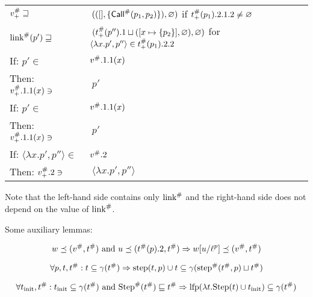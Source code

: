 \begin{center}
\begin{tabular}{|l@{\hskip2pt}l|}
    \hfill ${v}^{\#}_+\sqsupseteq$                            & $\:(([],\{{\mathsf{Call}}^{\#}(p_1,p_2)\}),\varnothing)$                                      \hfill if ${t}^{\#}_+(p_1).2.1.2\neq\varnothing$                  \\
    \hfill ${\textnormal{link}}^{\#}(p')\sqsupseteq$                        & $\:({t}^{\#}_+(p'').1\sqcup([x\mapsto\{p_2\}],\varnothing),\varnothing)$          \hfill for $\langle\lambda x.p',p''\rangle\in{t}^{\#}_+(p_1).2.2$ \\
    \hline
    If:           \hfill $p'\in$                             & ${v}^{\#}.1.1(x)$                                                                                                                                        \\
    Then:         \hfill ${v}^{\#}_+.1.1(x)\ni$               & $\:p'$                                                                                                                                                  \\
    \hline
    If:           \hfill $p'\in$                             & ${v}^{\#}.1.1(x)$                                                                                                                                        \\
    Then:         \hfill ${v}^{\#}_+.1.1(x)\ni$               & $\:p'$                                                                                                                                                  \\
    \hline
    If:           \hfill $\langle\lambda x.p',p''\rangle\in$ & ${v}^{\#}.2$                                                                                                                                             \\
    Then:         \hfill ${v}^{\#}_+.2\ni$                    & $\:\langle\lambda x.p',p''\rangle$                                                                                                                      \\
    \hline
  \end{tabular}
\end{center}
Note that the left-hand side contains only ${\textnormal{link}}^{\#}$ and the right-hand side does not depend on the value of ${\textnormal{link}}^{\#}$.

Some auxiliary lemmas:
\begin{lem}
  \[w\preceq({v}^{\#},{t}^{\#})\textnormal{ and }u\preceq({t}^{\#}(p).2,{t}^{\#})\Rightarrow w[u/{\ell}^{p}]\preceq({v}^{\#},{t}^{\#})\]
\end{lem}
\begin{lem}
  \[\forall p,t,{t}^{\#}:t\subseteq\gamma({t}^{\#})\Rightarrow\textnormal{step}(t,p)\cup t\subseteq\gamma({\textnormal{step}}^{\#}({t}^{\#},p)\sqcup{t}^{\#})\]
\end{lem}
\begin{lem}
  \[\forall t_{\textnormal{init}},{t}^{\#}:t_{\textnormal{init}}\subseteq\gamma({t}^{\#})\textnormal{ and }{\textnormal{Step}}^{\#}({t}^{\#})\sqsubseteq{t}^{\#}\Rightarrow\textnormal{lfp}(\lambda t.\textnormal{Step}(t)\cup t_{\textnormal{init}})\subseteq\gamma({t}^{\#})\]
\end{lem}
